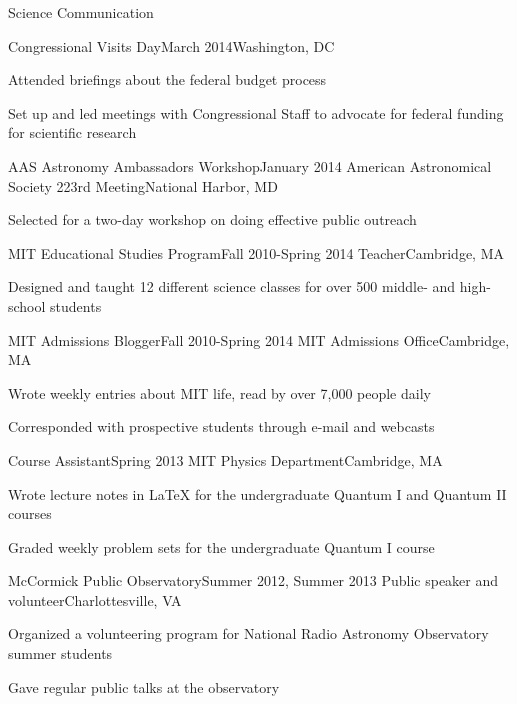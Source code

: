 \documentclass{resume} %
\begin{document}
\begin{rSection}{Science Communication}
\begin{rSubsection}
  \end{rSubsection}

\begin{rSubsection}{Congressional Visits Day}{March 2014}{}{Washington, DC}
\item Attended briefings about the federal budget process
\item Set up and led meetings with Congressional Staff to advocate 
  for federal funding for scientific research
\end{rSubsection}

\begin{rSubsection}{AAS Astronomy Ambassadors Workshop}{January 2014}
  {American Astronomical Society 223rd Meeting}{National Harbor, MD}
\item Selected for a two-day workshop on doing effective public outreach 
\end{rSubsection}

\begin{rSubsection}{MIT Educational Studies Program}{Fall 2010-Spring 2014}
  {Teacher}{Cambridge, MA}
\item Designed and taught 12 different science classes for over 500 middle- 
  and high-school students
\end{rSubsection}

\begin{rSubsection}{MIT Admissions Blogger}{Fall 2010-Spring 2014}
  {MIT Admissions Office}{Cambridge, MA}
\item Wrote weekly entries about MIT life, read by over 7,000 people daily
\item Corresponded with prospective students through e-mail and webcasts
\end{rSubsection}

\begin{rSubsection}{Course Assistant}{Spring 2013}
  {MIT Physics Department}{Cambridge, MA}
\item Wrote lecture notes in LaTeX for the undergraduate Quantum I 
  and Quantum II courses
\item Graded weekly problem sets for the undergraduate Quantum I course
\end{rSubsection}

\begin{rSubsection}{McCormick Public Observatory}{Summer 2012, Summer 2013}
  {Public speaker and volunteer}{Charlottesville, VA}
\item Organized a volunteering program for National Radio Astronomy Observatory 
  summer students
\item Gave regular public talks at the observatory
\end{rSubsection}


\end{rSection}
\end{document}

